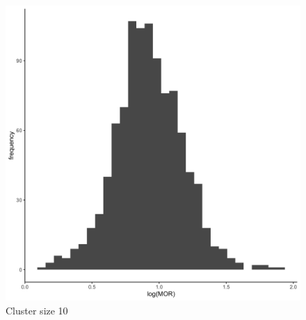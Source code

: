 \documentclass[
  letterpaper,
  DIV=11,
  numbers=noendperiod,
  titlepage]{scrartcl}
\begin{document}
\begin{figure}
\begin{minipage}[t]{0.24\linewidth}
{{\includegraphics{../../plots/two-lvl-ran-slope/high-prev/hist_50_10_two_lvl_slp_high_prev_q3.png}

}

\caption{Cluster size 10}

}

\end{minipage}%
%
\begin{minipage}[t]{0.24\linewidth}

{\centering 

}
\end{minipage}
\end{figure}
\end{document}
